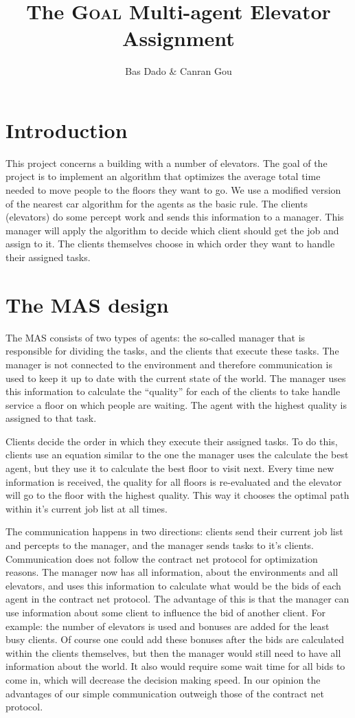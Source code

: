 \documentclass[a4paper,10pt,twocolumn]{article}
\title{The \textsc{Goal} Multi-agent Elevator Assignment}
\author{Bas Dado \& Canran Gou}
\begin{document}
\maketitle

\section{Introduction}
This project concerns a building with a number of elevators. The goal of the project is to implement an algorithm that optimizes the average total time needed to move people to the floors they want to go. We use a modified version of the nearest car algorithm for the agents as the basic rule. The clients (elevators) do some percept work and sends this information to a manager. This manager will apply the algorithm to decide which client should get the job and assign to it.
The clients themselves choose in which order they want to handle their assigned tasks.

\section{The MAS design}
The MAS consists of two types of agents: the so-called manager that is responsible for dividing the tasks, and the clients that execute these tasks. The manager is not connected to the environment and therefore communication is used to keep it up to date with the current state of the world. The manager uses this information  to calculate the ``quality'' for each of the clients to take handle service a floor on which people are waiting. The agent with the highest quality is assigned to that task. 

Clients decide the order in which they execute their assigned tasks. To do this, clients use an equation similar to the one the manager uses the calculate the best agent, but they use it to calculate the best floor to visit next. Every time new information is received, the quality for all floors is re-evaluated and the elevator will go to the floor with the highest quality. This way it chooses the optimal path within it's current job list at all times.

The communication happens in two directions: clients send their current job list and percepts to the manager, and the manager sends tasks to it's clients. Communication does not follow the contract net protocol for optimization reasons. The manager now has all information, about the environments and all elevators, and uses this information to calculate what would be the bids of each agent in the contract net protocol. The advantage of this is that the manager can use information about some client to influence the bid of another client. For example: the number of elevators is used and bonuses are added for the least busy clients. Of course one could add these bonuses after the bids are calculated within the clients themselves, but then the manager would still need to have all information about the world. It also would require some wait time for all bids to come in, which will decrease the decision making speed. In our opinion the advantages of our simple communication outweigh those of the contract net protocol.
\end{document}
